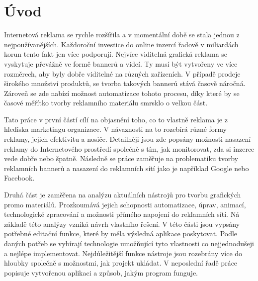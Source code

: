 \chapter{Úvod}
\label{chap:Introduction}
Internetová reklama se rychle rozšířila a v momentální době se stala jednou z nejpoužívanějších. Každoroční investice do online inzercí řadově v miliardách korun tento fakt jen více podporují.
Nejvíce viditelná grafická reklama se vyskytuje převážně ve formě bannerů a videí. Ty musí být vytvořeny ve více rozměrech, aby byly dobře viditelné na různých zařízeních.
V případě prodeje širokého množství produktů, se tvorba takových bannerů stává časově náročná. Zároveň se zde nabízí možnost automatizace tohoto procesu, díky které by se 
časové měřítko tvorby reklamního materiálu smrsklo o velkou část.

Tato práce v první částí cílí na objasnění toho, co to vlastně reklama je z hlediska marketingu organizace. V návaznosti na to rozebírá různé formy reklamy, jejich efektivitu
a nosiče. Detailněji jsou zde popsány možnosti nasazení reklamy do Internetového prostředí společně s tím, jak monitorovat, zda si inzerce vede dobře nebo špatně.
Následně se práce zaměřuje na problematiku tvorby reklamních bannerů a nasazení do reklamních sítí jako je například Google nebo Facebook.

Druhá část je zaměřena na analýzu aktuálních nástrojů pro tvorbu grafických promo materiálů. Prozkoumává jejich schopnosti automatizace, úprav, animací, technologické zpracování a možnosti
přímého napojení do reklamních sítí.
Ná základě této analýzy vzniká návrh vlastního řešení. V této části jsou vypsány potřebné editační funkce, které by měla výsledná aplikace poskytovat. Podle daných potřeb
se vybírají technologie umožňující tyto vlastnosti co nejjednodušeji a nejlépe implementovat. Nejdůležitější funkce nástroje jsou rozebrány více do hloubky společně s možnostmi,
jak projekt ukládat.
V neposlední řadě práce popisuje vytvořenou aplikaci a způsob, jakým program funguje.


\endinput